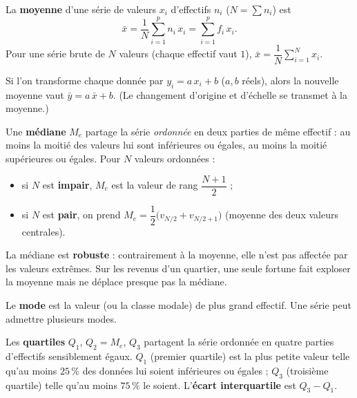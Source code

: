 \begin{definition}
La \textbf{moyenne} d'une série de valeurs $x_i$ d'effectifs $n_i$ ($N=\sum n_i$) est
\[
\bar x=\frac1N\sum_{i=1}^{p}n_i\,x_i=\sum_{i=1}^{p}f_i\,x_i .
\]
Pour une série brute de $N$ valeurs (chaque effectif vaut $1$),
$\bar x=\dfrac1N\sum_{i=1}^{N}x_i$.
\end{definition}

\begin{propriete}
Si l'on transforme chaque donnée par $y_i=a\,x_i+b$ ($a,b$ réels), alors la nouvelle
moyenne vaut $\bar y=a\,\bar x+b$. (Le changement d'origine et d'échelle se transmet
à la moyenne.)
\end{propriete}

\begin{definition}[Médiane]
Une \textbf{médiane} $M_e$ partage la série \emph{ordonnée} en deux parties de même
effectif : au moins la moitié des valeurs lui sont inférieures ou égales, au moins
la moitié supérieures ou égales. Pour $N$ valeurs ordonnées :
\begin{itemize}
\item si $N$ est \textbf{impair}, $M_e$ est la valeur de rang $\dfrac{N+1}{2}$ ;
\item si $N$ est \textbf{pair}, on prend $M_e=\dfrac{1}{2}\big(v_{N/2}+v_{N/2+1}\big)$
(moyenne des deux valeurs centrales).
\end{itemize}
\end{definition}

\begin{remarque}
La médiane est \textbf{robuste} : contrairement à la moyenne, elle n'est pas affectée
par les valeurs extrêmes. Sur les revenus d'un quartier, une seule fortune fait
exploser la moyenne mais ne déplace presque pas la médiane.
\end{remarque}

\begin{definition}[Mode]
Le \textbf{mode} est la valeur (ou la classe modale) de plus grand effectif. Une série
peut admettre plusieurs modes.
\end{definition}

\begin{definition}[Quartiles]
Les \textbf{quartiles} $Q_1$, $Q_2=M_e$, $Q_3$ partagent la série ordonnée en quatre
parties d'effectifs sensiblement égaux. $Q_1$ (premier quartile) est la plus petite
valeur telle qu'au moins $25\,\%$ des données lui soient inférieures ou égales ; $Q_3$
(troisième quartile) telle qu'au moins $75\,\%$ le soient. L'\textbf{écart
interquartile} est $Q_3-Q_1$.
\end{definition}

